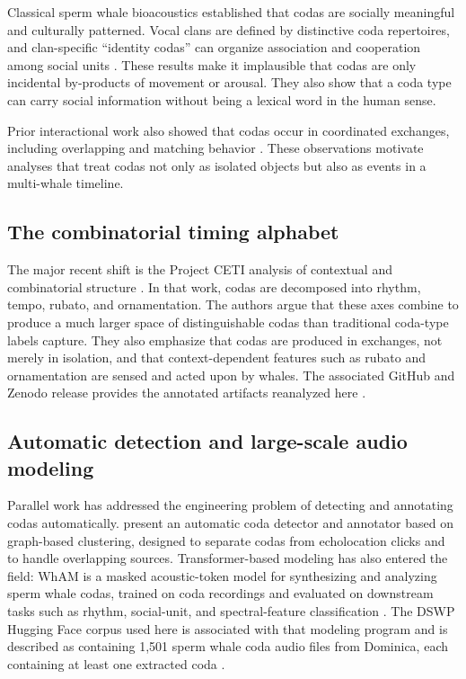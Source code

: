 \documentclass[11pt]{article}
\begin{document}
Classical sperm whale bioacoustics established that codas are socially meaningful and culturally patterned. Vocal clans are defined by distinctive coda repertoires, and clan-specific ``identity codas'' can organize association and cooperation among social units \citep{rendell2003clans,gero2016identity}. These results make it implausible that codas are only incidental by-products of movement or arousal. They also show that a coda type can carry social information without being a lexical word in the human sense.

Prior interactional work also showed that codas occur in coordinated exchanges, including overlapping and matching behavior \citep{schulz2008overlapping}. These observations motivate analyses that treat codas not only as isolated objects but also as events in a multi-whale timeline.

\subsection{The combinatorial timing alphabet}

The major recent shift is the Project CETI analysis of contextual and combinatorial structure \citep{sharma2024contextual}. In that work, codas are decomposed into rhythm, tempo, rubato, and ornamentation. The authors argue that these axes combine to produce a much larger space of distinguishable codas than traditional coda-type labels capture. They also emphasize that codas are produced in exchanges, not merely in isolation, and that context-dependent features such as rubato and ornamentation are sensed and acted upon by whales. The associated GitHub and Zenodo release provides the annotated artifacts reanalyzed here \citep{swcombinatoriality}.

\subsection{Automatic detection and large-scale audio modeling}

Parallel work has addressed the engineering problem of detecting and annotating codas automatically. \citet{gubnitsky2025automatic} present an automatic coda detector and annotator based on graph-based clustering, designed to separate codas from echolocation clicks and to handle overlapping sources. Transformer-based modeling has also entered the field: WhAM is a masked acoustic-token model for synthesizing and analyzing sperm whale codas, trained on coda recordings and evaluated on downstream tasks such as rhythm, social-unit, and spectral-feature classification \citep{paradise2025wham}. The DSWP Hugging Face corpus used here is associated with that modeling program and is described as containing 1,501 sperm whale coda audio files from Dominica, each containing at least one extracted coda \citep{dswpdataset}.
\end{document}
